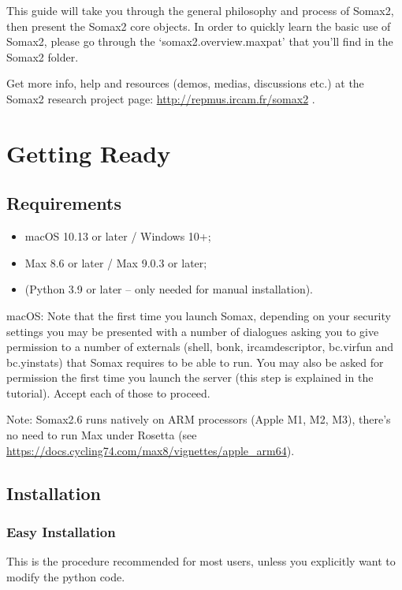 This guide will take you through the general philosophy and process of Somax2, then present the Somax2 core objects. In order to quickly learn the basic use of Somax2, please go through the `somax2.overview.maxpat' that you'll find in the Somax2 folder.

Get more info, help and resources (demos, medias, discussions etc.) at the Somax2 research project page: \url{http://repmus.ircam.fr/somax2} .

\section{Getting Ready}

\subsection{Requirements}

\begin{itemize}
    \item macOS 10.13 or later / Windows 10+;
    \item Max 8.6 or later / Max 9.0.3 or later;
    \item (Python 3.9 or later -- only needed for manual installation).
\end{itemize}

macOS: Note that the first time you launch Somax, depending on your security settings you may be presented with a number of dialogues asking you to give permission to a number of externals (shell, bonk, ircamdescriptor, bc.virfun and bc.yinstats) that Somax requires to be able to run. You may also be asked for permission the first time you launch the server (this step is explained in the tutorial). Accept each of those to proceed.

Note: Somax2.6 runs natively on ARM processors (Apple M1, M2, M3), there's no need to run Max under Rosetta (see \url{https://docs.cycling74.com/max8/vignettes/apple_arm64}).

\subsection{Installation}

\subsubsection{Easy Installation}

This is the procedure recommended for most users, unless you explicitly want to modify the python code.

